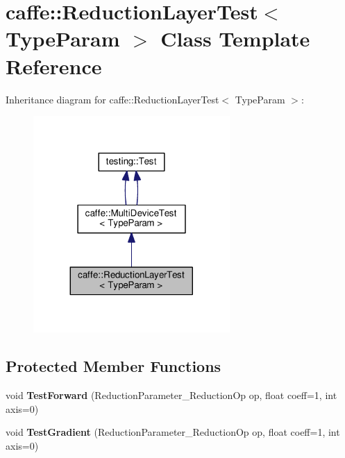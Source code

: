 \hypertarget{classcaffe_1_1_reduction_layer_test}{}\section{caffe\+:\+:Reduction\+Layer\+Test$<$ Type\+Param $>$ Class Template Reference}
\label{classcaffe_1_1_reduction_layer_test}


Inheritance diagram for caffe\+:\+:Reduction\+Layer\+Test$<$ Type\+Param $>$\+:
\nopagebreak
\begin{figure}[H]
\begin{center}
\leavevmode
\includegraphics[width=212pt]{classcaffe_1_1_reduction_layer_test__inherit__graph}
\end{center}
\end{figure}
\subsection*{Protected Member Functions}
\begin{DoxyCompactItemize}
\item 
\mbox{\label{classcaffe_1_1_reduction_layer_test_a7f3653a98a7b67814cb2b552cb2f3eef}} 
void {\bfseries Test\+Forward} (Reduction\+Parameter\+\_\+\+Reduction\+Op op, float coeff=1, int axis=0)
\item 
\mbox{\label{classcaffe_1_1_reduction_layer_test_af14e33681aeb0fea27a37edac28ca1f5}} 
void {\bfseries Test\+Gradient} (Reduction\+Parameter\+\_\+\+Reduction\+Op op, float coeff=1, int axis=0)
\end{DoxyCompactItemize}
